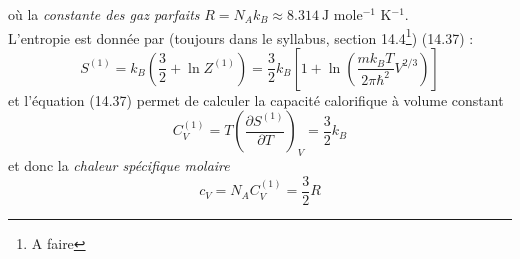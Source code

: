 \documentclass	[11pt, a4paper, openany]{book}
\begin{document}
où la \textit{constante des gaz parfaits} $R = N_Ak_B \approx 8.314\ \text{J mole$^{-1}$ K$^{-1}$}$.\\
L'entropie est donnée par (toujours dans le syllabus, section 14.4\footnote{A faire}) (14.37) :
\begin{equation}
S^{(1)} = k_B(\frac{3}{2}+\ln Z^{(1)}) = \frac{3}{2}k_B\left[1+\ln\left(\dfrac{mk_BT}{2\pi\hbar^2}V^{
2/3}\right)\right]
\end{equation}
et l'équation (14.37) permet de calculer la capacité calorifique à volume constant 
\begin{equation}
C_V^{(1)} = T\left(\frac{\partial S^{(1)}}{\partial T}\right)_V = \frac{3}{2}k_B
\end{equation}
et donc la \textit{chaleur spécifique molaire}
\begin{equation}
c_V = N_AC_V^ {(1)} = \frac{3}{2}R
\end{equation}
\end{document}

